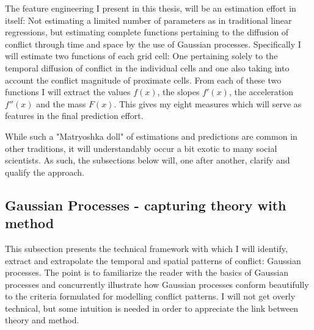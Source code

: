 \documentclass[a4paper]{article}
\begin{document}
The feature engineering I present in this thesis, will be an estimation effort in itself: Not estimating a limited number of parameters as in traditional linear regressions, but estimating complete functions pertaining to the diffusion of conflict through time and space by the use of Gaussian processes. Specifically I will estimate two functions of each grid cell: One pertaining solely to the temporal diffusion of conflict in the individual cells and one also taking into account the conflict magnitude of proximate cells. From each of these two functions I will extract the values $f(x)$, the slopes $f'(x)$, the acceleration $f''(x)$ and the mass $F(x)$. This gives my eight measures which will serve as features in the final prediction effort.\par

While such a "Matryoshka doll" of estimations and predictions are common in other traditions, it will understandably occur a bit exotic to many social scientists. As such, the subsections below will, one after another, clarify and qualify the approach.\par

\subsection{Gaussian Processes - capturing theory with method}\label{GPS}  %

This subsection presents the technical framework with which I will identify, extract and extrapolate the temporal and spatial patterns of conflict: Gaussian processes. The point is to familiarize the reader with the basics of Gaussian processes and concurrently illustrate how Gaussian processes conform beautifully to the criteria formulated for modelling conflict patterns. I will not get overly technical, but some intuition is needed in order to appreciate the link between theory and method.\par

\end{document}
